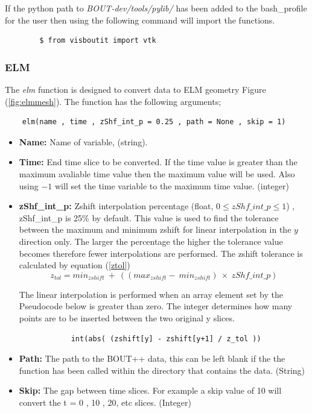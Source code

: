 \documentclass[12pt,a4paper]{article}
\begin{document}
	If the python path to \textit{BOUT-dev/tools/pylib/} has been added to the bash\_profile for the user then using the following command will import the functions.

	\begin{verbatim}
		$ from visboutit import vtk
	\end{verbatim}
	
	
	\subsubsection{ELM}
	\label{sec:elm_scalar}
	The \textit{elm} function is designed to convert data to ELM geometry Figure (\ref{fig:elmmesh}). The function has the following arguments;
		
	\begin{verbatim}
	elm(name , time , zShf_int_p = 0.25 , path = None , skip = 1)
	\end{verbatim}	
	
	
	\begin{itemize}
		\item{\textbf{Name:} Name of variable, (string).}
		
		\item{\textbf{Time:} End time slice to be converted. If the time value is greater than the maximum avaliable time value then the maximum value will be used. Also using  $-1$ will set the time variable to the maximum time value. (integer)}
		
		\item{\textbf{zShf\_int\_p:} Zshift interpolation percentage (float, $0\leq zShf\_int\_p \leq 1 $) , zShf\_int\_p is 25\% by default. This value is used to find the tolerance between the maximum and minimum zshift for linear interpolation in the $y$ direction only. The larger the percentage the higher the tolerance value becomes therefore fewer interpolations are performed. The zshift tolerance is calculated by equation (\ref{ztol}) 
		\begin{equation}
			\label{ztol}
			z_{tol} = min_{zshift}\ +\ ((max_{zshift} - \ min_{zshift}) \ \times \ zShf\_int\_p)
		\end{equation}

		The linear interpolation is performed when an array element set by the Pseudocode below is greater than zero. The integer determines how many points are to be inserted between the two original y slices.


		\begin{verbatim}
			int(abs( (zshift[y] - zshift[y+1] / z_tol ))
		\end{verbatim}}
		
		\item{\textbf{Path:} The path to the BOUT++ data, this can be left blank if the the function has been called within the directory that contains the data. (String)}

		\item{\textbf{Skip:} The gap between time slices. For example a skip value of 10 will convert the t = 0 , 10 , 20, etc slices. (Integer)}
		
	\end{itemize}
	
\end{document}
